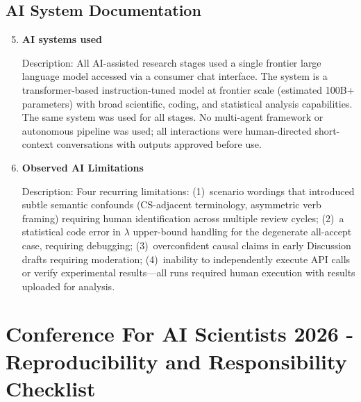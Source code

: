 \documentclass{article}
\begin{document}
\subsection*{AI System Documentation}

\begin{enumerate}
\setcounter{enumi}{4}

\item \textbf{AI systems used}

Description: All AI-assisted research stages used a single frontier large language model accessed via a
consumer chat interface. The system is a transformer-based instruction-tuned model at frontier scale
(estimated 100B+ parameters) with broad scientific, coding, and statistical analysis capabilities. The
same system was used for all stages. No multi-agent framework or autonomous pipeline was used; all
interactions were human-directed short-context conversations with outputs approved before use.

\item \textbf{Observed AI Limitations}

Description: Four recurring limitations: (1)~scenario wordings that introduced subtle semantic
confounds (CS-adjacent terminology, asymmetric verb framing) requiring human identification across
multiple review cycles; (2)~a statistical code error in $\lambda$ upper-bound handling for the
degenerate all-accept case, requiring debugging; (3)~overconfident causal claims in early Discussion
drafts requiring moderation; (4)~inability to independently execute API calls or verify experimental
results---all runs required human execution with results uploaded for analysis.

\end{enumerate}

\newpage

\section*{Conference For AI Scientists 2026 - Reproducibility and Responsibility Checklist}
\label{checklist_reproducibility}
\end{document}
